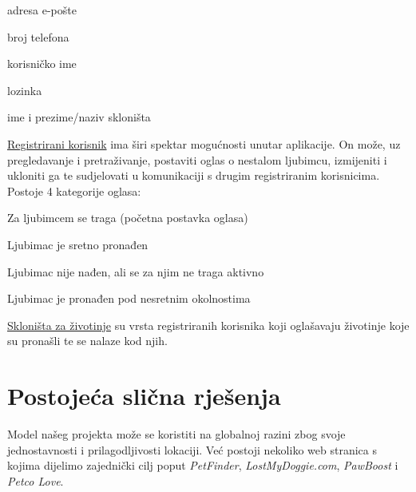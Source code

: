 		\begin{packed_item}
			\item adresa e-pošte
			\item broj telefona
			\item korisničko ime
			\item lozinka
			\item ime i prezime/naziv skloništa
		\end{packed_item}
		
		\underline{Registrirani korisnik} ima širi spektar mogućnosti unutar aplikacije. On može, uz pregledavanje i pretraživanje, postaviti oglas o nestalom ljubimcu, izmijeniti i ukloniti ga te sudjelovati u komunikaciji s drugim registriranim korisnicima.\\
		
		Postoje 4 kategorije oglasa:
		
		\begin{packed_item}
			\item Za ljubimcem se traga (početna postavka oglasa)
			\item Ljubimac je sretno pronađen
			\item Ljubimac nije nađen, ali se za njim ne traga aktivno
			\item Ljubimac je pronađen pod nesretnim okolnostima
		\end{packed_item}
		
		\underline{Skloništa za životinje} su vrsta registriranih korisnika koji oglašavaju životinje koje su pronašli te se nalaze kod njih.
		
		\eject
		
		\section{Postojeća slična rješenja}
		
		Model našeg projekta može se koristiti na globalnoj razini zbog svoje jednostavnosti i prilagodljivosti lokaciji. Već postoji nekoliko web stranica s kojima dijelimo zajednički cilj poput \textit{PetFinder}, \textit{LostMyDoggie.com}, \textit{PawBoost} i \textit{Petco Love}.
		
